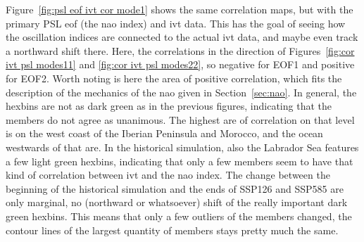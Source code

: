 Figure~\ref{fig:psl eof ivt cor mode1} shows the same correlation maps, but with the primary PSL \ac{eof} (the \ac{nao} index) and \ac{ivt} data. 
This has the goal of seeing how the oscillation indices are connected to the actual \ac{ivt} data, and maybe even track a northward shift there. 
Here, the correlations in the direction of Figures~\ref{fig:cor ivt psl modes11} and \ref{fig:cor ivt psl modes22}, so negative for EOF1 and positive for EOF2.  
Worth noting is here the area of positive correlation, which fits the description of the mechanics of the \ac{nao} given in Section~\ref{sec:nao}. 
In general, the hexbins are not as dark green as in the previous figures, indicating that the members do not agree as unanimous. 
The highest are of correlation on that level is on the west coast of the Iberian Peninsula and Morocco, and the ocean westwards of that are. 
In the historical simulation, also the Labrador Sea features a few light green hexbins, indicating that only a few members seem to have that kind of correlation between \ac{ivt} and the \ac{nao} index. 
The change between the beginning of the historical simulation and the ends of SSP126 and SSP585 are only marginal, no (northward or whatsoever) shift of the really important dark green hexbins. 
This means that only a few outliers of the members changed, the contour lines of the largest quantity of members stays pretty much the same. 


